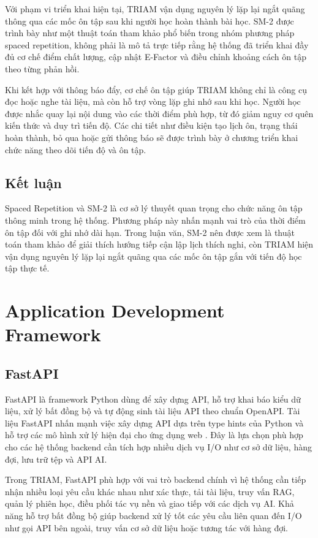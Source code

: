 \documentclass[12pt,a4paper]{report}
\begin{document}
Với phạm vi triển khai hiện tại, TRIAM vận dụng nguyên lý lặp lại ngắt quãng thông qua các mốc ôn tập sau khi người học hoàn thành bài học. SM-2 được trình bày như một thuật toán tham khảo phổ biến trong nhóm phương pháp spaced repetition, không phải là mô tả trực tiếp rằng hệ thống đã triển khai đầy đủ cơ chế điểm chất lượng, cập nhật E-Factor và điều chỉnh khoảng cách ôn tập theo từng phản hồi.

Khi kết hợp với thông báo đẩy, cơ chế ôn tập giúp TRIAM không chỉ là công cụ đọc hoặc nghe tài liệu, mà còn hỗ trợ vòng lặp ghi nhớ sau khi học. Người học được nhắc quay lại nội dung vào các thời điểm phù hợp, từ đó giảm nguy cơ quên kiến thức và duy trì tiến độ. Các chi tiết như điều kiện tạo lịch ôn, trạng thái hoàn thành, bỏ qua hoặc gửi thông báo sẽ được trình bày ở chương triển khai chức năng theo dõi tiến độ và ôn tập.

\subsection{Kết luận}

Spaced Repetition và SM-2 là cơ sở lý thuyết quan trọng cho chức năng ôn tập thông minh trong hệ thống. Phương pháp này nhấn mạnh vai trò của thời điểm ôn tập đối với ghi nhớ dài hạn. Trong luận văn, SM-2 nên được xem là thuật toán tham khảo để giải thích hướng tiếp cận lập lịch thích nghi, còn TRIAM hiện vận dụng nguyên lý lặp lại ngắt quãng qua các mốc ôn tập gắn với tiến độ học tập thực tế.

\section{Application Development Framework}

\subsection{FastAPI}

FastAPI là framework Python dùng để xây dựng API, hỗ trợ khai báo kiểu dữ liệu, xử lý bất đồng bộ và tự động sinh tài liệu API theo chuẩn OpenAPI. Tài liệu FastAPI nhấn mạnh việc xây dựng API dựa trên type hints của Python và hỗ trợ các mô hình xử lý hiện đại cho ứng dụng web \cite{fastapiDocs}. Đây là lựa chọn phù hợp cho các hệ thống backend cần tích hợp nhiều dịch vụ I/O như cơ sở dữ liệu, hàng đợi, lưu trữ tệp và API AI.

Trong TRIAM, FastAPI phù hợp với vai trò backend chính vì hệ thống cần tiếp nhận nhiều loại yêu cầu khác nhau như xác thực, tải tài liệu, truy vấn RAG, quản lý phiên học, điều phối tác vụ nền và giao tiếp với các dịch vụ AI. Khả năng hỗ trợ bất đồng bộ giúp backend xử lý tốt các yêu cầu liên quan đến I/O như gọi API bên ngoài, truy vấn cơ sở dữ liệu hoặc tương tác với hàng đợi.
\end{document}
